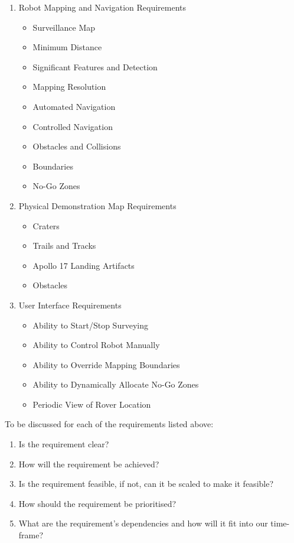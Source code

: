 \documentclass[11pt, a4paper]{article}
\begin{document}
\begin{flushleft}
  	
  	\begin{enumerate}
    \item Robot Mapping and Navigation Requirements
    	\begin{itemize}
    	\item Surveillance Map
		\item Minimum Distance
        \item Significant Features and Detection
        \item Mapping Resolution
        \item Automated Navigation
        \item Controlled Navigation
        \item Obstacles and Collisions
        \item Boundaries
        \item No-Go Zones
		\end{itemize}
     \item Physical Demonstration Map Requirements
    	\begin{itemize}
    	\item Craters
        \item Trails and Tracks
        \item Apollo 17 Landing Artifacts
        \item Obstacles
		\end{itemize}
     \item User Interface Requirements
    	\begin{itemize}
        \item Ability to Start/Stop Surveying
        \item Ability to Control Robot Manually
        \item Ability to Override Mapping Boundaries
        \item Ability to Dynamically Allocate No-Go Zones
        \item Periodic View of Rover Location
		\end{itemize}      
	\end{enumerate}
       
    To be discussed for each of the requirements listed above:
	\begin{enumerate}
    \item Is the requirement clear?
    \item How will the requirement be achieved?
    \item Is the requirement feasible, if not, can it be scaled to make it feasible?
    \item How should the requirement be prioritised?
    \item What are the requirement's dependencies and how will it fit into our time-frame?
	\end{enumerate}
    

\end{flushleft}
\end{document}
